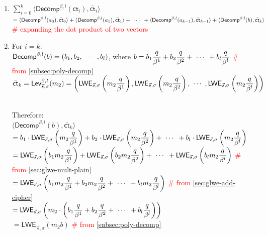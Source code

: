 \begin{myproof}
\begin{enumerate}
\item $\sum\limits_{i=0}^{k}\langle \textsf{Decomp}^{\beta, l}(\textsf{ct}_i), \bar{\textsf{ct}}_i \rangle$ \\
$= \langle \textsf{Decomp}^{\beta, l}(a_0), \bar{\textsf{ct}}_0 \rangle + \langle \textsf{Decomp}^{\beta, l}(a_1), \bar{\textsf{ct}}_1 \rangle + \text{ } \text{$\cdots$} \text{ } + \langle \textsf{Decomp}^{\beta, l}(a_{k-1}), \bar{\textsf{ct}}_{k-1} \rangle + \langle \textsf{Decomp}^{\beta, l}(b), \bar{\textsf{ct}}_k \rangle$ \\
\textcolor{red}{\# expanding the dot product of two vectors}
\item For $i = k$: \\
$\textsf{Decomp}^{\beta, l}(b) = (b_1, b_2, \text{ } \text{$\cdots$} \text{ }, b_l)$, where $b = b_1\dfrac{q}{\beta^1} + b_2\dfrac{q}{\beta^2} + \text{ } \text{$\cdots$} \text{ } + b_l\dfrac{q}{\beta^l}$ \textcolor{red}{\# from \autoref{subsec:poly-decomp}}\\
$\bar{\textsf{ct}}_k = \textsf{Lev}_{\vec{s}, \sigma}^{\beta, l}(m_2) = \left(\textsf{LWE}_{\vec{s}, \sigma}\left(m_{2}\dfrac{q}{\beta^1}\right), \textsf{LWE}_{\vec{s}, \sigma}\left(m_{2}\dfrac{q}{\beta^2}\right), \text{ } \text{$\cdots$} \text{ }, \textsf{LWE}_{\vec{s}, \sigma}\left(m_{2}\dfrac{q}{\beta^l}\right) \right)$ \\
$ $

Therefore: \\
$\langle \textsf{Decomp}^{\beta, l}(b), \bar{\textsf{ct}}_k \rangle$\\
$= b_1 \cdot \textsf{LWE}_{\vec{s}, \sigma} \left (m_{2}\dfrac{q}{\beta^1} \right ) + b_2 \cdot \textsf{LWE}_{\vec{s}, \sigma} \left (m_{2}\dfrac{q}{\beta^2} \right ) + \text{ } \text{$\cdots$} \text{ } + b_l \cdot \textsf{LWE}_{\vec{s}, \sigma} \left (m_{2}\dfrac{q}{\beta^l}\right)$ \\
$= \textsf{LWE}_{\vec{s}, \sigma} \left (b_1m_{2}\dfrac{q}{\beta^1} \right ) + \textsf{LWE}_{\vec{s}, \sigma} \left (b_2m_{2}\dfrac{q}{\beta^2} \right ) + \text{ } \text{$\cdots$} \text{ } + \textsf{LWE}_{\vec{s}, \sigma} \left (b_lm_{2}\dfrac{q}{\beta^l}\right)$ \textcolor{red}{\# from \autoref{sec:glwe-mult-plain}} \\
$= \textsf{LWE}_{\vec{s}, \sigma} \left (b_1m_{2}\dfrac{q}{\beta^1} + b_2m_{2}\dfrac{q}{\beta^2} + \text{ } \text{$\cdots$} \text{ } + b_lm_{2}\dfrac{q}{\beta^l}\right)$ \textcolor{red}{\# from \autoref{sec:glwe-add-cipher}}\\
$= \textsf{LWE}_{\vec{s}, \sigma} \left (m_{2} \cdot \left ( b_1\dfrac{q}{\beta^1} + b_2\dfrac{q}{\beta^2} + \text{ } \text{$\cdots$} \text{ } + b_l\dfrac{q}{\beta^l} \right)\right)$ \\
$= \textsf{LWE}_{\vec{s}, \sigma} (m_{2}b)$ \textcolor{red}{\# from \autoref{subsec:poly-decomp}}


\end{enumerate}
\end{myproof}
